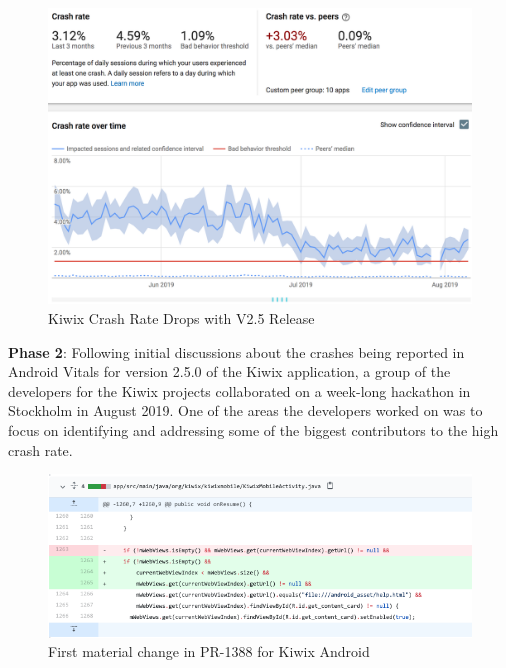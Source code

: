 \begin{figure}[htbp!]
    \centering
    \includegraphics[width=\textwidth]{images/android-vitals-screenshots/kiwix-crash-rate-drops-with-v2_5.png}
    \caption{Kiwix Crash Rate Drops with V2.5 Release}
    \label{fig:kiwix_crash_rate_drops_v2_5}
\end{figure}

\textbf{Phase 2}: Following initial discussions about the crashes being reported in Android Vitals for version 2.5.0 of the Kiwix application, a group of the developers for the Kiwix projects collaborated on a week-long hackathon in Stockholm in August 2019. One of the areas the developers worked on was to focus on identifying and addressing some of the biggest contributors to the high crash rate. 
%

\begin{figure}
    \centering
    \includegraphics[width=14cm]{images/github/kiwix-pr1388-extract-1.png}
    \caption{First material change in PR-1388 for Kiwix Android}
    \label{fig:kiwix_pr1388_extract_1}
\end{figure}


